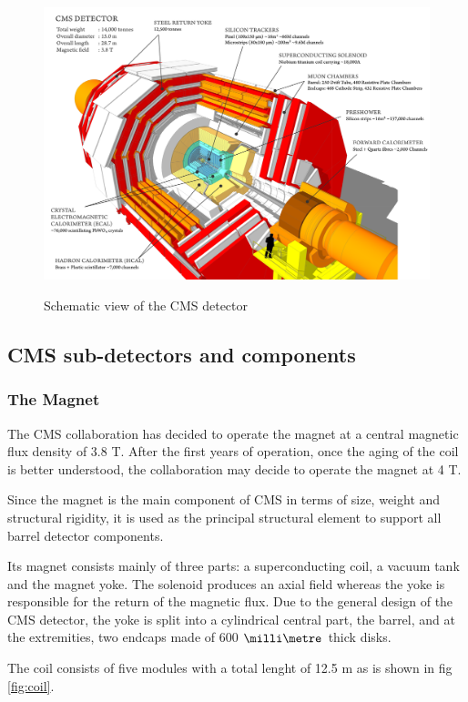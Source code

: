 \begin{figure}[h]
  \centering
\includegraphics[width=15cm]{CMS_chapter_plots/cms_120918_03}
\label{figure}\caption{Schematic view of the CMS detector}
\end{figure}


\subsection{CMS sub-detectors and components}

\subsubsection{The Magnet}

The CMS collaboration has decided to operate the magnet at a central magnetic flux density
of 3.8 T. After the first years of operation, once the aging of the coil is better understood, the
collaboration may decide to operate the magnet at 4 T.

Since the magnet is the main component of CMS in terms of size, weight and structural
rigidity, it is used as the principal structural element to support all barrel detector components.


Its magnet consists mainly of three parts: a superconducting coil, a vacuum tank and the magnet yoke. The solenoid produces an axial field whereas the yoke is responsible for the return of the magnetic flux. Due to the general design of the CMS detector, the yoke is split into a cylindrical central part, the barrel, and at the extremities, two endcaps made of 600 $\mm$ thick disks.


The coil consists of five modules with a total lenght of 12.5 m as is shown in fig \ref{fig:coil}. 

